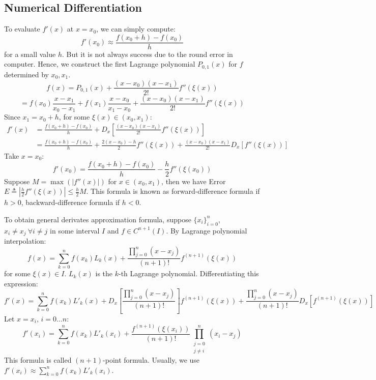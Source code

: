 \documentclass[12pt, a4paper]{article}
\theoremstyle{break}
\begin{document}
\subsection{Numerical Differentiation}
To evaluate $f'(x)$ at $x = x_0$, we can simply compute:
\[ f'(x_0) \approx \frac{f(x_0+h) - f(x_0)}{h} \]
for a small value $h$. But it is not always success due to the round error in computer. Hence, we construct the first Lagrange polynomial $P_{0,1}(x)$ for $f$ determined by $x_0, x_1$.
\[ f(x) = P_{0,1}(x) + \frac{(x-x_0)(x-x_1)}{2!} f''(\xi(x)) \]
\[ = f(x_0) \frac{x-x_1}{x_0-x_1} + f(x_1) \frac{x-x_0}{x_1-x_0} + \frac{(x-x_0)(x-x_1)}{2!} f''(\xi(x)) \]
Since $x_1 = x_0 + h$, for some $\xi(x) \in (x_0, x_1)$:
\begin{align*}
f'(x) &= \frac{f(x_0+h) - f(x_0)}{h} + D_x \left[ \frac{(x-x_0)(x-x_1)}{2!} f''(\xi(x)) \right] \\
&= \frac{f(x_0+h) - f(x_0)}{h} + \frac{2(x-x_0)-h}{2} f''(\xi(x)) + \frac{(x-x_0)(x-x_1)}{2!} D_x[f''(\xi(x))]
\end{align*}
Take $x = x_0$:
\begin{equation}
    f'(x_0) = \frac{f(x_0+h) - f(x_0)}{h} - \frac{h}{2} f''(\xi(x_0))
\end{equation}
Suppose $M = \max(|f''(x)|)$ for $x \in (x_0, x_1)$, then we have Error $E \triangleq \left|\frac{h}{2} f''(\xi(x))\right| \le \frac{h}{2} M$. This formula is known as forward-difference formula if $h > 0$, backward-difference formula if $h < 0$.

To obtain general derivates approximation formula, suppose $\{x_i\}_{i=0}^{n}$, $x_i \neq x_j \ \forall i \neq j$ in some interval $I$ and $f \in C^{n+1}(I)$. By Lagrange polynomial interpolation:
\[ f(x) = \sum_{k=0}^{n} f(x_k) L_k(x) + \frac{\prod_{j=0}^{n} (x-x_j)}{(n+1)!} f^{(n+1)}(\xi(x)) \]
for some $\xi(x) \in I$. $L_k(x)$ is the $k$-th Lagrange polynomial. Differentiating this expression:
\[ f'(x) = \sum_{k=0}^{n} f(x_k) L'_k(x) + D_x \left[ \frac{\prod_{j=0}^{n} (x-x_j)}{(n+1)!} \right] f^{(n+1)}(\xi(x)) + \frac{\prod_{j=0}^{n} (x-x_j)}{(n+1)!} D_x [f^{(n+1)}(\xi(x))] \]
Let $x = x_i$, $i = 0 \dots n$:
\[ f'(x_i) = \sum_{k=0}^{n} f(x_k) L'_k(x_i) + \frac{f^{(n+1)}(\xi(x_i))}{(n+1)!} \prod_{\substack{j=0 \\ j \neq i}}^{n} (x_i - x_j) \]
This formula is called $(n+1)$-point formula. Usually, we use $f'(x_i) \approx \sum_{k=0}^{n} f(x_k) L'_k(x_i)$.
\end{document}
